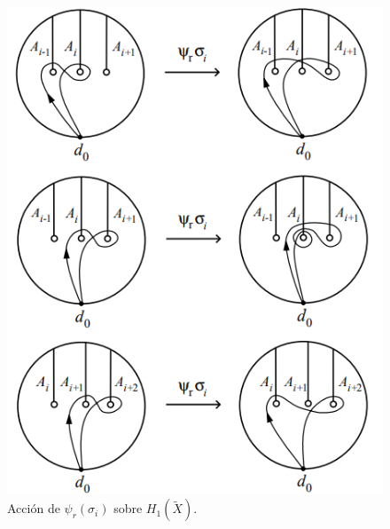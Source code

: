 \documentclass[TFG.tex]{subfiles}
\begin{document}






\begin{figure}[h!]
\includegraphics[scale=0.7]{Imagenes/Burau}
\caption{Acción de $\psi_r(\sigma_i)$ sobre $H_1(\widetilde{X})$.}\label{representacion}
\end{figure}
\end{document}
